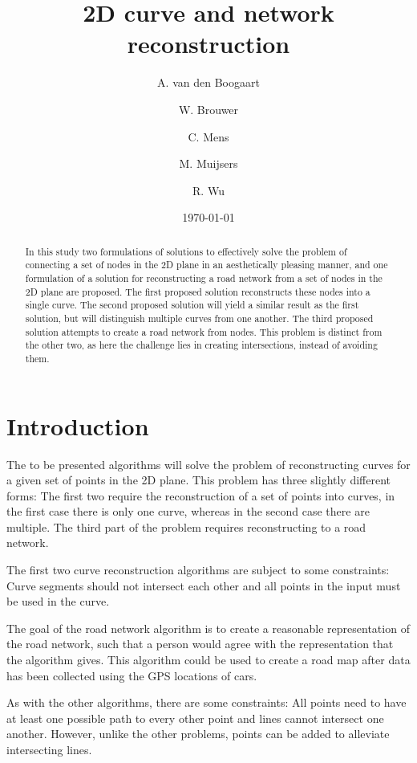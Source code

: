 \documentclass[11pt]{article}
\title{2D curve and network reconstruction}
\author{
A. van den Boogaart \and
W. Brouwer \and
C. Mens \and
M. Muijsers \and
R. Wu
}
\date{\today}
\begin{document}
\newpage

\maketitle

\begin{abstract}
In this study  two formulations of solutions to effectively solve the problem of connecting a set of nodes in the 2D plane in an aesthetically pleasing manner, and one formulation of a solution for reconstructing a road network from a set of nodes in the 2D plane are proposed.
The first proposed solution reconstructs these nodes into a single curve.
The second proposed solution will yield a similar result as the first solution, but will distinguish multiple curves from one another.
The third proposed solution attempts to create a road network from nodes. This problem is distinct from the other two, as here the challenge lies in creating intersections, instead of avoiding them.

\end{abstract}

\section{Introduction}
\label{se:introduction}
The to be presented algorithms will solve the problem of reconstructing curves for a given set of points in the 2D plane. This problem has three slightly different forms: The first two require the reconstruction of a set of points into curves, in the first case there is only one curve, whereas in the second case there are multiple. The third part of the problem requires reconstructing to a road network.

The first two curve reconstruction algorithms are subject to some constraints: Curve segments should not intersect each other and all points in the input must be used in the curve.

The goal of the road network algorithm is to create a reasonable representation of the road network, such that a person would agree with the representation that the algorithm gives. This algorithm could be used to create a road map after data has been collected using the GPS locations of cars.

As with the other algorithms, there are some constraints: All points need to have at least one possible path to every other point and lines cannot intersect one another. However, unlike the other problems, points can be added to alleviate intersecting lines.
\end{document}
